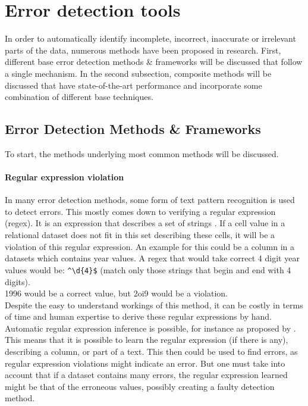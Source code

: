 \section{Error detection tools}
In order to automatically identify incomplete, incorrect, inaccurate or irrelevant parts of the data, numerous methods have been proposed in research. First, different base error detection methods \& frameworks will be discussed that follow a single mechanism. In the second subsection, composite methods will be discussed that have state-of-the-art performance and incorporate some combination of different base techniques.

\subsection{Error Detection Methods \& Frameworks}
To start, the methods underlying most common methods will be discussed.

\paragraph{Regular expression violation}
In many error detection methods, some form of text pattern recognition is used to detect errors. This mostly comes down to verifying a regular expression (regex). It is an expression that describes a set of strings \cite{Mitkov2004-fz}. If a cell value in a relational dataset does not fit in this set describing these cells, it will be a violation of this regular expression. An example for this could be a column in a datasets which contains year values. A regex that would take correct 4 digit year values would be: \verb|^\d{4}$| (match only those strings that begin and end with 4 digits). 
\\1996 would be a correct value, but 2oi9 would be a violation. 
\\Despite the easy to understand workings of this method, it can be costly in terms of time and human expertise to derive these regular expressions by hand.
Automatic regular expression inference is possible, for instance as proposed by \cite{Bartoli2016-hx}. This means that it is possible to learn the regular expression (if there is any), describing a column, or part of a text. This then could be used to find errors, as regular expression violations might indicate an error. But one must take into account that if a dataset contains many errors, the regular expression learned might be that of the erroneous values, possibly creating a faulty detection method.
    
